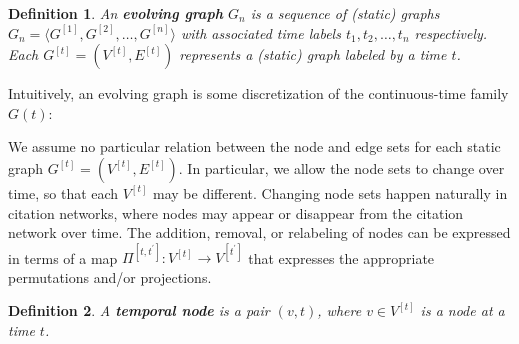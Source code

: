 \documentclass[10pt,conference,compsocconf]{IEEEtran}
\newtheorem{defn}{Definition}
\theoremstyle{definition}
\begin{document}
\begin{defn}
An \textbf{evolving graph} $G_n$ is a sequence of
(static) graphs
$G_n = \langle G^{[1]}, G^{[2]}, \ldots, G^{[n]} \rangle$ with associated
time labels $t_1, t_2, \ldots, t_n$ respectively.
Each $G^{[t]} = (V^{[t]}, E^{[t]})$ represents a (static) graph labeled by a
time $t$.
\end{defn}

Intuitively, an evolving graph is some discretization of the continuous-time family $G(t)$:

\begin{center}
\end{center}


We assume no particular relation between the node and edge sets for each static
graph $G^{[t]} = (V^{[t]}, E^{[t]})$. In particular, we allow the node sets to
change over time, so that each $V^{[t]}$ may be different. Changing
node sets happen naturally in citation networks, where nodes may appear or
disappear from the citation network over time.
The addition, removal, or relabeling of nodes can be expressed in terms
of a map $\Pi^{[t,t^\prime]} : V^{[t]} \rightarrow V^{[t^\prime]}$ that expresses
the appropriate permutations and/or projections.



\begin{defn}
A \textbf{temporal node} is a pair $(v, t)$, where $v\in V^{[t]}$ is a node at
a time $t$.
\end{defn}
\end{document}
